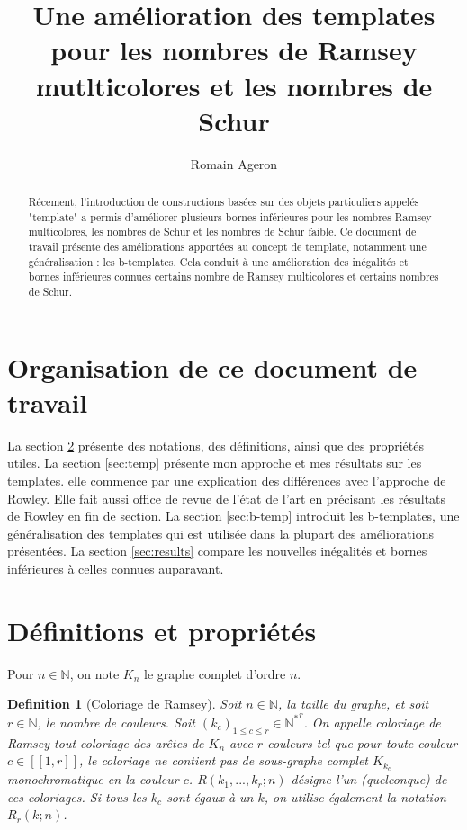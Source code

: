 \documentclass{article}
\title{Une amélioration des templates pour les nombres de Ramsey mutlticolores et les nombres de Schur}
\author{Romain Ageron}
\newtheorem{definition}{Definition}[section]
\begin{document}
\maketitle

\begin{abstract}
Récement, l'introduction de constructions basées sur des objets particuliers appelés "template" a permis d'améliorer plusieurs bornes inférieures pour les nombres Ramsey multicolores, les nombres de Schur et les nombres de Schur faible. Ce document de travail présente des améliorations apportées au concept de template, notamment une généralisation : les b-templates. Cela conduit à une amélioration des inégalités et bornes inférieures connues certains nombre de Ramsey multicolores et certains nombres de Schur.
\end{abstract}

\section{Organisation de ce document de travail}
La section \ref{sec:def} présente des notations, des définitions, ainsi que des propriétés utiles. La section \ref{sec:temp} présente mon approche et mes résultats sur les templates. elle commence par une explication des différences avec l'approche de Rowley. Elle fait aussi office de revue de l'état de l'art en précisant les résultats de Rowley en fin de section. La section \ref{sec:b-temp} introduit les b-templates, une généralisation des templates qui est utilisée dans la plupart des améliorations présentées. La section \ref{sec:results} compare les nouvelles inégalités et bornes inférieures à celles connues auparavant.

\section{Définitions et propriétés}
\label{sec:def}

Pour \(n \in \mathbb{N}\), on note \(K_n\) le graphe complet d'ordre \(n\).

\begin{definition}[Coloriage de Ramsey]
Soit \(n \in \mathbb{N}\), la taille du graphe, et soit \(r \in \mathbb{N}\), le nombre de couleurs. Soit \((k_c)_{1 \leqslant c \leqslant r} \in {\mathbb{N}^*}^r\). On appelle coloriage de Ramsey tout coloriage des arêtes de \(K_n\) avec \(r\) couleurs tel que pour toute couleur \(c \in [\![1, r]\!]\), le coloriage ne contient pas de sous-graphe complet \(K_{k_c}\) monochromatique en la couleur \(c\). \(R(k_1, ..., k_r ; n)\) désigne l'un (quelconque) de ces coloriages. Si tous les \(k_c\) sont égaux à un \(k\), on utilise également la notation \(R_r(k; n)\).
\end{definition}
\end{document}
